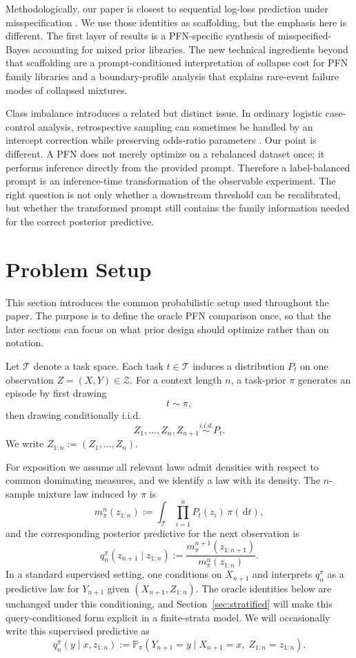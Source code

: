 \documentclass{article}
\theoremstyle{definition}
\theoremstyle{remark}
\newcommand{\Pbb}{\mathbb{P}}
\newcommand{\cT}{\mathcal{T}}
\newcommand{\cZ}{\mathcal{Z}}
\newcommand{\dd}{\,\mathrm{d}}
\begin{document}
Methodologically, our paper is closest to sequential log-loss prediction under misspecification \citep{clarke1990,amari1993,feder2021,morningstar2022,agrawal2025}. We use those identities as scaffolding, but the emphasis here is different. The first layer of results is a PFN-specific synthesis of misspecified-Bayes accounting for mixed prior libraries. The new technical ingredients beyond that scaffolding are a prompt-conditioned interpretation of collapse cost for PFN family libraries and a boundary-profile analysis that explains rare-event failure modes of collapsed mixtures.

Class imbalance introduces a related but distinct issue. In ordinary logistic case-control analysis, retrospective sampling can sometimes be handled by an intercept correction while preserving odds-ratio parameters \citep{prentice1979}. Our point is different. A PFN does not merely optimize on a rebalanced dataset once; it performs inference directly from the provided prompt. Therefore a label-balanced prompt is an inference-time transformation of the observable experiment. The right question is not only whether a downstream threshold can be recalibrated, but whether the transformed prompt still contains the family information needed for the correct posterior predictive.

\section{Problem Setup}
\label{sec:setup}

This section introduces the common probabilistic setup used throughout the paper. The purpose is to define the oracle PFN comparison once, so that the later sections can focus on what prior design should optimize rather than on notation.

Let $\cT$ denote a task space. Each task $t\in\cT$ induces a distribution $P_t$ on one observation $Z=(X,Y)\in\cZ$. For a context length $n$, a task-prior $\pi$ generates an episode by first drawing
\[
t \sim \pi,
\]
then drawing conditionally i.i.d.
\[
Z_1,\dots,Z_n,Z_{n+1} \stackrel{i.i.d.}{\sim} P_t.
\]
We write $Z_{1:n}:=(Z_1,\dots,Z_n)$.

For exposition we assume all relevant laws admit densities with respect to common dominating measures, and we identify a law with its density. The $n$-sample mixture law induced by $\pi$ is
\[
m_\pi^n(z_{1:n})
:=
\int_{\cT}
\prod_{i=1}^n P_t(z_i)\,\pi(\dd t),
\]
and the corresponding posterior predictive for the next observation is
\[
q_n^\pi(z_{n+1}\mid z_{1:n})
:=
\frac{m_\pi^{n+1}(z_{1:n+1})}{m_\pi^n(z_{1:n})}.
\]
In a standard supervised setting, one conditions on $X_{n+1}$ and interprets $q_n^\pi$ as a predictive law for $Y_{n+1}$ given $(X_{n+1},Z_{1:n})$. The oracle identities below are unchanged under this conditioning, and Section~\ref{sec:stratified} will make this query-conditioned form explicit in a finite-strata model.
We will occasionally write this supervised predictive as
\[
q_n^\pi(y\mid x,z_{1:n})
:=
\Pbb_\pi(Y_{n+1}=y\mid X_{n+1}=x,\;Z_{1:n}=z_{1:n}).
\]
\end{document}
